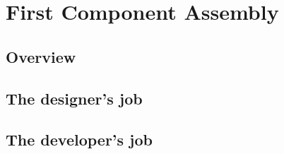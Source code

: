 
\chapter{First Component Assembly}
\begin{flushright}
{\it }
\end{flushright}

\section{Overview}



\section{The designer's job}

\section{The developer's job}

